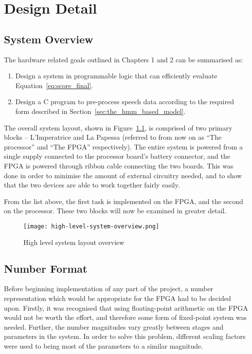 \chapter{Design Detail} %
\label{cha:system_design}

\section{System Overview} %
\label{sec:system_overview}
	The hardware related goals outlined in Chapters 1 and 2 can be summarised as:
	\begin{enumerate}
		\item Design a system in programmable logic that can efficiently evaluate Equation~\ref{eq:score_final}.
		\item Design a C program to pre-process speech data according to the required form described in Section~\ref{sec:the_hmm_based_model}.
	\end{enumerate}

	The overall system layout, shown in Figure~\ref{fig:hlsystem}, is comprised of two primary blocks -- L'Imperatrice and La Papessa (referred to from now on as ``The processor'' and ``The FPGA'' respectively).  
	The entire system is powered from a single supply connected to the processor board's battery connector, and the FPGA is powered through ribbon cable connecting the two boards.  This was done in order to minimise the amount of external circuitry needed, and to show that the two devices are able to work together fairly easily.

	From the list above, the first task is implemented on the FPGA, and the second on the processor.  These two blocks will now be examined in greater detail.



	\begin{figure}[tb]
		\begin{center}
			\texttt{[image: high-level-system-overview.png]}
		\end{center}
		\caption{High level system layout overview}
		\label{fig:hlsystem}
	\end{figure}


\section{Number Format} %
\label{sec:number_format}
	Before beginning implementation of any part of the project, a number representation which would be appropriate for the FPGA had to be decided upon.  Firstly, it was recognised that using floating-point arithmetic on the FPGA would not be worth the effort, and therefore some form of fixed-point system was needed.  Further, the number magnitudes vary greatly between stages and parameters in the system.  In order to solve this problem, different scaling factors were used to being most of the parameters to a similar magnitude.  

